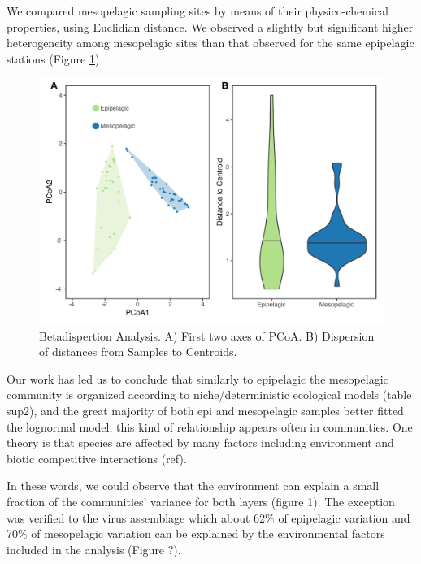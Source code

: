 \documentclass[fleqn,10pt]{wlscirep}
\begin{document}
We compared mesopelagic sampling sites by means of their physico-chemical properties, using Euclidian distance. We observed a slightly but significant higher heterogeneity among mesopelagic sites than that observed for the same epipelagic stations (Figure \ref{fig:betadipersion})

\begin{figure}[ht]
    \centering
    \includegraphics[scale=0.5]{images/betadisp_diganose_to_print.pdf}
    \caption{Betadispertion Analysis. A) First two axes of PCoA. B) Dispersion of distances from Samples to Centroids.}
    \label{fig:betadipersion}
\end{figure}

Our work has led us to conclude that similarly to epipelagic the mesopelagic community is organized according to niche/deterministic ecological models (table sup2), and the great majority of both epi and mesopelagic samples better fitted the lognormal model, this kind of relationship appears often in communities. One theory is that species are affected by many factors including environment and biotic competitive interactions (ref). 

In these words, we could observe that the environment can explain a small fraction of the communities’ variance for both layers (figure 1). The exception was verified to the virus assemblage which about 62\% of epipelagic variation and 70\% of mesopelagic variation can be explained by the environmental factors included in the analysis (Figure ?). 
\end{document}
